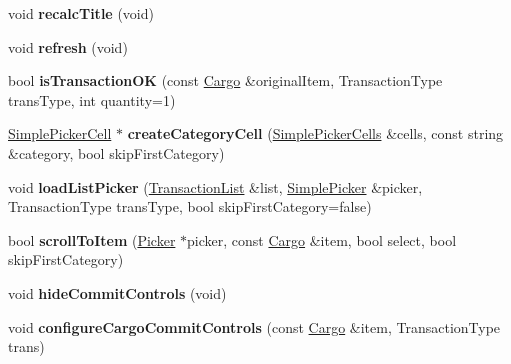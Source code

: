 \begin{DoxyCompactItemize}
\item 
void {\bfseries recalc\+Title} (void)\hypertarget{classBaseComputer_a7a2a0b0e78adc2355e4fa7336faba3c2}{}\label{classBaseComputer_a7a2a0b0e78adc2355e4fa7336faba3c2}

\item 
void {\bfseries refresh} (void)\hypertarget{classBaseComputer_ab487bf5b2d8964f502867eea6d79c738}{}\label{classBaseComputer_ab487bf5b2d8964f502867eea6d79c738}

\item 
bool {\bfseries is\+Transaction\+OK} (const \hyperlink{classCargo}{Cargo} \&original\+Item, Transaction\+Type trans\+Type, int quantity=1)\hypertarget{classBaseComputer_ac65cdbcc59139a38ed323998b45ce3cb}{}\label{classBaseComputer_ac65cdbcc59139a38ed323998b45ce3cb}

\item 
\hyperlink{classSimplePickerCell}{Simple\+Picker\+Cell} $\ast$ {\bfseries create\+Category\+Cell} (\hyperlink{classSimplePickerCells}{Simple\+Picker\+Cells} \&cells, const string \&category, bool skip\+First\+Category)\hypertarget{classBaseComputer_aa4efee9fb1cc70be3276d4f89d4c5c5d}{}\label{classBaseComputer_aa4efee9fb1cc70be3276d4f89d4c5c5d}

\item 
void {\bfseries load\+List\+Picker} (\hyperlink{structBaseComputer_1_1TransactionList}{Transaction\+List} \&list, \hyperlink{classSimplePicker}{Simple\+Picker} \&picker, Transaction\+Type trans\+Type, bool skip\+First\+Category=false)\hypertarget{classBaseComputer_a10f2eed9eabfd46084503f3d90d2ff9d}{}\label{classBaseComputer_a10f2eed9eabfd46084503f3d90d2ff9d}

\item 
bool {\bfseries scroll\+To\+Item} (\hyperlink{classPicker}{Picker} $\ast$picker, const \hyperlink{classCargo}{Cargo} \&item, bool select, bool skip\+First\+Category)\hypertarget{classBaseComputer_ab7d4200c207eefef5a612fa90008ac35}{}\label{classBaseComputer_ab7d4200c207eefef5a612fa90008ac35}

\item 
void {\bfseries hide\+Commit\+Controls} (void)\hypertarget{classBaseComputer_adc92718fdcc36321e6a18d5e8b758879}{}\label{classBaseComputer_adc92718fdcc36321e6a18d5e8b758879}

\item 
void {\bfseries configure\+Cargo\+Commit\+Controls} (const \hyperlink{classCargo}{Cargo} \&item, Transaction\+Type trans)\hypertarget{classBaseComputer_aca1491a8f5fc75d8f61ef0d6361e6a84}{}\label{classBaseComputer_aca1491a8f5fc75d8f61ef0d6361e6a84}


\end{DoxyCompactItemize}
